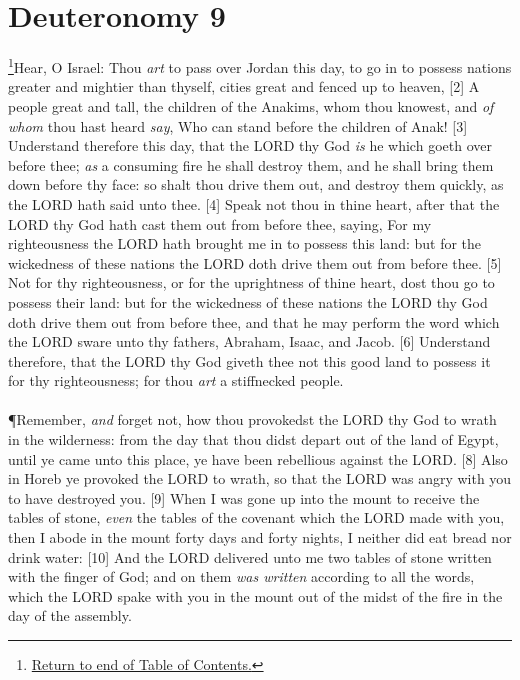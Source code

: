 \chapter{Deuteronomy 9}
\footnote{\textcolor[rgb]{0.00,0.25,0.00}{\hyperlink{DeuteronomyTOC}{Return to end of Table of Contents.}}}\textcolor[rgb]{0.00,0.00,1.00}{Hear, O Israel: Thou \emph{art} to pass over Jordan this day, to go in to possess nations greater and mightier than thyself, cities great and fenced up to heaven,}
[2] \textcolor[rgb]{0.00,0.00,1.00}{A people great and tall, the children of the Anakims, whom thou knowest, and \emph{of whom} thou hast heard \emph{say}, Who can stand before the children of Anak!}
[3] \textcolor[rgb]{0.00,0.00,1.00}{Understand therefore this day, that the LORD thy God \emph{is} he which goeth over before thee; \emph{as} a consuming fire he shall destroy them, and he shall bring them down before thy face: so shalt thou drive them out, and destroy them quickly, as the LORD hath said unto thee.}
[4] \textcolor[rgb]{0.00,0.00,1.00}{Speak not thou in thine heart, after that the LORD thy God hath cast them out from before thee, saying, For my righteousness the LORD hath brought me in to possess this land: but for the wickedness of these nations the LORD doth drive them out from before thee.}
[5] \textcolor[rgb]{0.00,0.00,1.00}{Not for thy righteousness, or for the uprightness of thine heart, dost thou go to possess their land: but for the wickedness of these nations the LORD thy God doth drive them out from before thee, and that he may perform the word which the LORD sware unto thy fathers, Abraham, Isaac, and Jacob.}
[6] \textcolor[rgb]{0.00,0.00,1.00}{Understand therefore, that the LORD thy God giveth thee not this good land to possess it for thy righteousness; for thou \emph{art} a stiffnecked people.}\\
\\
\P \textcolor[rgb]{0.00,0.00,1.00}{Remember, \emph{and} forget not, how thou provokedst the LORD thy God to wrath in the wilderness: from the day that thou didst depart out of the land of Egypt, until ye came unto this place, ye have been rebellious against the LORD.}
[8] \textcolor[rgb]{0.00,0.00,1.00}{Also in Horeb ye provoked the LORD to wrath, so that the LORD was angry with you to have destroyed you.}
[9] \textcolor[rgb]{0.00,0.00,1.00}{When I was gone up into the mount to receive the tables of stone, \emph{even} the tables of the covenant which the LORD made with you, then I abode in the mount forty days and forty nights, I neither did eat bread nor drink water:}
[10] \textcolor[rgb]{0.00,0.00,1.00}{And the LORD delivered unto me two tables of stone written with the finger of God; and on them \emph{was written} according to all the words, which the LORD spake with you in the mount out of the midst of the fire in the day of the assembly.}
